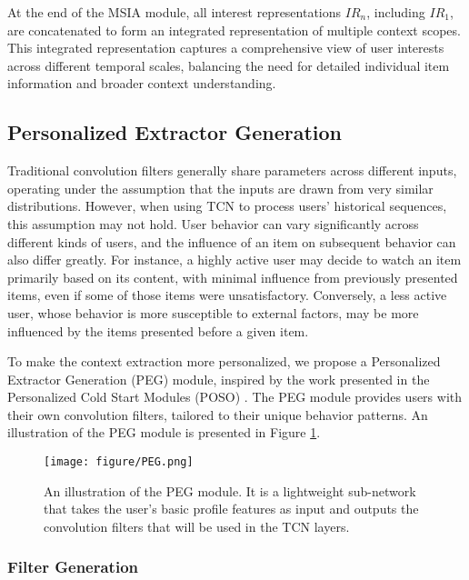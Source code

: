 At the end of the MSIA module, all interest representations $IR_n$, including $IR_1$, are concatenated to form an integrated representation of multiple context scopes. This integrated representation captures a comprehensive view of user interests across different temporal scales, balancing the need for detailed individual item information and broader context understanding. 

\subsection{Personalized Extractor Generation}

Traditional convolution filters generally share parameters across different inputs, operating under the assumption that the inputs are drawn from very similar distributions. However, when using TCN to process users' historical sequences, this assumption may not hold. User behavior can vary significantly across different kinds of users, and the influence of an item on subsequent behavior can also differ greatly. For instance, a highly active user may decide to watch an item primarily based on its content, with minimal influence from previously presented items, even if some of those items were unsatisfactory. Conversely, a less active user, whose behavior is more susceptible to external factors, may be more influenced by the items presented before a given item. 

To make the context extraction more personalized, we propose a Personalized Extractor Generation (PEG) module, inspired by the work presented in the Personalized Cold Start Modules (POSO) \cite{dai2021poso}. The PEG module provides users with their own convolution filters, tailored to their unique behavior patterns. An illustration of the PEG module is presented in Figure \ref{fig:PEG}. 

\begin{figure}
    \centering
    \texttt{[image: figure/PEG.png]}
    \caption{An illustration of the PEG module. It is a lightweight sub-network that takes the user's basic profile features as input and outputs the convolution filters that will be used in the TCN layers. }
    \label{fig:PEG}
    \vspace{-0.3cm}
\end{figure}

\subsubsection{Filter Generation}

